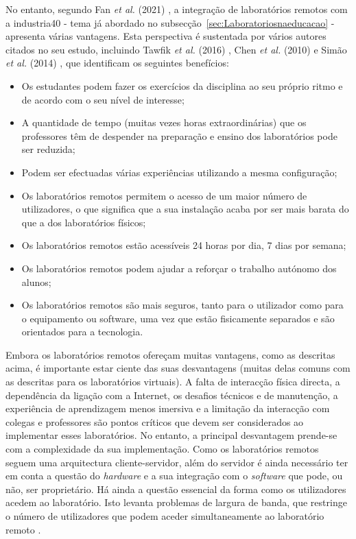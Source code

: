 No entanto, segundo Fan \textit{et al.} (2021) \cite{EvaluationRemoteVirtualE-Learning}, a integração de laboratórios remotos com a \gls{industria40} - tema já abordado no subsecção~\ref{sec:Laboratoriosnaeducacao} - apresenta várias vantagens. Esta perspectiva é sustentada por vários autores citados no seu estudo, incluindo Tawfik \textit{et al.} (2016) \cite{RemoteLabsImpactVISIR}, Chen \textit{et al.} (2010) \cite{DevelopingVirtualAndRemoteUndergraduate} e Simão \textit{et al.} (2014) \cite{RemoteLabsDevelopingCountries}, que identificam os seguintes benefícios:
\begin{itemize}
    \item Os estudantes podem fazer os exercícios da disciplina ao seu próprio ritmo e de acordo com o seu nível de interesse;
    \item A quantidade de tempo (muitas vezes horas extraordinárias) que os professores têm de despender na preparação e ensino dos laboratórios pode ser reduzida;
    \item Podem ser efectuadas várias experiências utilizando a mesma configuração;
    \item Os laboratórios remotos permitem o acesso de um maior número de utilizadores, o que significa que a sua instalação acaba por ser mais barata do que a dos laboratórios físicos;
    \item Os laboratórios remotos estão acessíveis 24 horas por dia, 7 dias por semana;
    \item Os laboratórios remotos podem ajudar a reforçar o trabalho autónomo dos alunos;
    \item Os laboratórios remotos são mais seguros, tanto para o utilizador como para o equipamento ou software, uma vez que estão fisicamente separados e são orientados para a tecnologia.
\end{itemize}

Embora os laboratórios remotos ofereçam muitas vantagens, como as descritas acima, é importante estar ciente das suas desvantagens (muitas delas comuns com as descritas para os laboratórios virtuais). A falta de interacção física directa, a dependência da ligação com a Internet, os desafios técnicos e de manutenção, a experiência de aprendizagem menos imersiva e a limitação da interacção com colegas e professores são pontos críticos que devem ser considerados ao implementar esses laboratórios. No entanto, a principal desvantagem prende-se com a complexidade da sua implementação. Como os laboratórios remotos seguem uma arquitectura cliente-servidor, além do servidor é ainda necessário ter em conta a questão do \textit{hardware} e a sua integração com o \textit{software} que pode, ou não, ser proprietário. Há ainda a questão essencial da forma como os utilizadores acedem ao laboratório. Isto levanta problemas de largura de banda, que restringe o número de utilizadores que podem aceder simultaneamente ao laboratório remoto \cite{HERADIO20161}.


